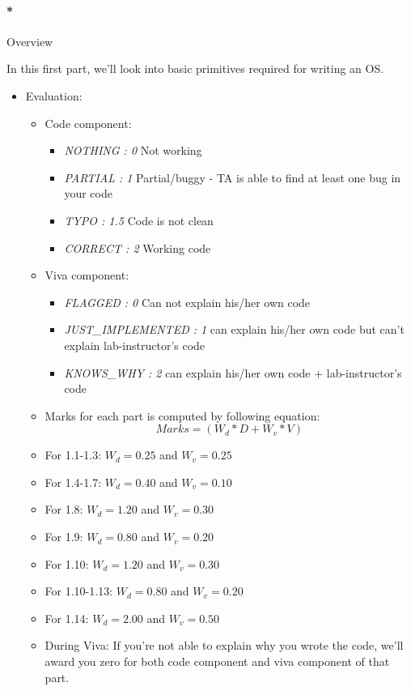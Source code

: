 \documentclass[]{article}
\providecommand{\tightlist}{%
  \setlength{\itemsep}{0pt}\setlength{\parskip}{0pt}}
\let\oldparagraph\paragraph
\renewcommand{\paragraph}[1]{\oldparagraph{#1}\mbox{}}
\begin{document}
\paragraph*{Overview}\label{overview}

In this first part, we'll look into basic primitives required for
writing an OS.

\begin{itemize}
\tightlist
\item
  Evaluation:

  \begin{itemize}
  \item
    Code component:

    \begin{itemize}
    \tightlist
    \item
      \emph{NOTHING : 0 } Not working
    \item
      \emph{PARTIAL : 1 } Partial/buggy - TA is able to find at least
      one bug in your code
    \item
      \emph{TYPO : 1.5} Code is not clean
    \item
      \emph{CORRECT : 2 } Working code
    \end{itemize}
  \item
    Viva component:

    \begin{itemize}
    \tightlist
    \item
      \emph{FLAGGED : 0 } Can not explain his/her own code
    \item
      \emph{JUST\_IMPLEMENTED : 1 } can explain his/her own code but
      can't explain lab-instructor's code
    \item
      \emph{KNOWS\_WHY : 2 } can explain his/her own code +
      lab-instructor's code
    \end{itemize}
  \item
    Marks for each part is computed by following equation:
    \[ Marks = (W_d * D + W_v * V) \]
  \item
    For 1.1-1.3: \(W_d = 0.25\) and \(W_v = 0.25\)
  \item
    For 1.4-1.7: \(W_d = 0.40\) and \(W_v = 0.10\)
  \item
    For 1.8: \(W_d = 1.20\) and \(W_v = 0.30\)
  \item
    For 1.9: \(W_d = 0.80\) and \(W_v = 0.20\)
  \item
    For 1.10: \(W_d = 1.20\) and \(W_v = 0.30\)
  \item
    For 1.10-1.13: \(W_d = 0.80\) and \(W_v = 0.20\)
  \item
    For 1.14: \(W_d = 2.00\) and \(W_v = 0.50\)
  \item
    During Viva: If you're not able to explain why you wrote the code,
    we'll award you zero for both code component and viva component of
    that part.


\end{itemize}
\end{itemize}
\end{document}
